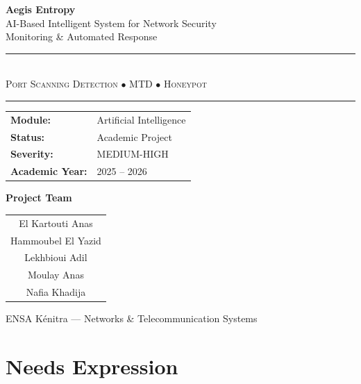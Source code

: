 \documentclass[12pt,a4paper]{report}
\begin{document}
\begin{titlepage}
  \centering
  \vspace*{2cm}
  {\Huge\bfseries Aegis Entropy}\\[0.8em]
  {\Large AI-Based Intelligent System for Network Security\\
  Monitoring \& Automated Response}\\[1.2em]
  \rule{\textwidth}{0.8pt}\\[0.4em]
  {\large\textsc{Port Scanning Detection \(\bullet\) MTD \(\bullet\) Honeypot}}\\[0.4em]
  \rule{\textwidth}{0.4pt}
  \vspace{1.5cm}

  \begin{tabular}{@{}ll@{}}
    \textbf{Module:}        & Artificial Intelligence \\[4pt]
    \textbf{Status:}        & Academic Project \\[4pt]
    \textbf{Severity:}      & MEDIUM-HIGH \\[4pt]
    \textbf{Academic Year:} & 2025 -- 2026 \\
  \end{tabular}

  \vspace{1.8cm}
  {\large\bfseries Project Team}\\[0.8em]
  \begin{tabular}{@{}c@{}}
    El Kartouti Anas \\[3pt]
    Hammoubel El Yazid \\[3pt]
    Lekhbioui Adil \\[3pt]
    Moulay Anas \\[3pt]
    Nafia Khadija \\
  \end{tabular}

  \vfill
  {\normalsize ENSA K\'{e}nitra --- Networks \& Telecommunication Systems}
\end{titlepage}

\tableofcontents
\clearpage

\part{Needs Expression}
\end{document}
